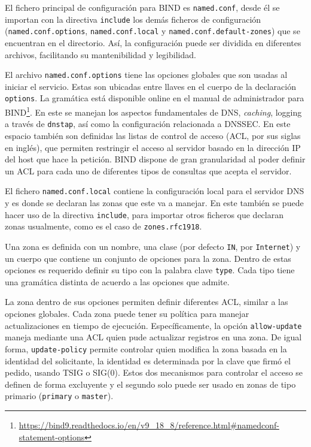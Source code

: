 El fichero principal de configuración para BIND es \verb+named.conf+, desde él se importan con la directiva \verb+include+ los demás ficheros de configuración (\verb|named.conf.options|, \verb|named.conf.local| y \verb|named.conf.default-zones|) que se encuentran en el directorio. Así, la configuración puede ser dividida en diferentes archivos, facilitando su mantenibilidad y legibilidad.

El archivo \verb+named.conf.options+ tiene las opciones globales que son usadas al iniciar el servicio. Estas son ubicadas entre llaves en el cuerpo de la declaración \verb+options+. La gramática está disponible online en el manual de administrador para BIND\footnote{\url{https://bind9.readthedocs.io/en/v9_18_8/reference.html\#namedconf-statement-options}}. En este se manejan los aspectos fundamentales de DNS, \textit{caching}, logging a través de \verb+dnstap+, así como la configuración relacionada a DNSSEC. En este espacio también son definidas las listas de control de acceso (ACL, por sus siglas en inglés), que permiten restringir el acceso al servidor basado en la dirección IP del host que hace la petición. BIND dispone de gran granularidad al poder definir un ACL para cada uno de diferentes tipos de consultas que acepta el servidor.

El fichero \verb+named.conf.local+ contiene la configuración local para el servidor DNS y es donde se declaran las zonas que este va a manejar. En este también se puede hacer uso de la directiva \verb+include+, para importar otros ficheros que declaran zonas usualmente, como es el caso de \verb+zones.rfc1918+.

Una zona es definida con un nombre, una clase (por defecto \verb+IN+, por \verb+Internet+) y un cuerpo que contiene un conjunto de opciones para la zona. Dentro de estas opciones es requerido definir su tipo con la palabra clave \verb+type+. Cada tipo tiene una gramática distinta de acuerdo a las opciones que admite.

La zona dentro de sus opciones permiten definir diferentes ACL, similar a las opciones globales. Cada zona puede tener su política para manejar actualizaciones en tiempo de ejecución. Específicamente, la opción \verb+allow-update+ maneja mediante una ACL quien pude actualizar registros en una zona. De igual forma, \verb+update-policy+ permite controlar quien modifica la zona basada en la identidad del solicitante, la identidad es determinada por la clave que firmó el pedido, usando TSIG o SIG(0). Estos dos mecanismos para controlar el acceso se definen de forma excluyente y el segundo solo puede ser usado en zonas de tipo primario (\verb+primary+ o \verb+master+).

